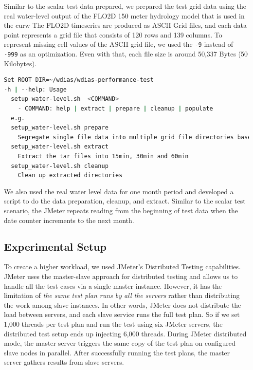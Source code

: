 Similar to the scalar test data prepared, we prepared the test grid data using the real water-level output of the FLO2D 150 meter hydrology model that is used in the \acrshort{curw} The FLO2D timeseries are produced as ASCII Grid files, and each data point represents a grid file that consists of 120 rows and 139 columns. To represent missing cell values of the ASCII grid file, we used the \texttt{-9} instead of \texttt{-999} as an optimization. Even with that, each file size is around 50,337 Bytes (50 Kilobytes).

\begin{lstlisting}[language=sh, caption= Preparation of water-level data.]
Set ROOT_DIR=~/wdias/wdias-performance-test
-h | --help: Usage
  setup_water-level.sh  <COMMAND>
    - COMMAND: help | extract | prepare | cleanup | populate
  e.g.
  setup_water-level.sh prepare
    Segregate single file data into multiple grid file directories based on date. And Separate into main directories of 15min, 30min, 60min and create tar files
  setup_water-level.sh extract
    Extract the tar files into 15min, 30min and 60min
  setup_water-level.sh cleanup
    Clean up extracted directories
\end{lstlisting}

We also used the real water level data for one month period and developed a script to do the data preparation, cleanup, and extract. Similar to the scalar test scenario, the JMeter repeats reading from the beginning of test data when the date counter increments to the next month.


\subsection{Experimental Setup}
\label{subse:experimental_setup}

To create a higher workload, we used JMeter's Distributed Testing capabilities. JMeter uses the master-slave approach for distributed testing and allows us to handle all the test cases via a single master instance. However, it has the limitation of \emph{the same test plan runs by all the servers} rather than distributing the work among slave instances. In other words, JMeter does not distribute the load between servers, and each slave service runs the full test plan. So if we set 1,000 threads per test plan and run the test using six JMeter servers, the distributed test setup ends up injecting 6,000 threads. During JMeter distributed mode, the master server triggers the same copy of the test plan on configured slave nodes in parallel. After successfully running the test plans, the master server gathers results from slave servers.

